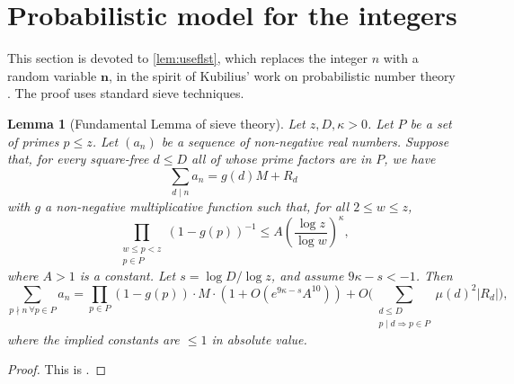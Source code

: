 \documentclass[11pt]{amsart}
\newtheorem{lemma}[theorem]{Lemma}
\theoremstyle{definition}
\renewcommand{\leq}{\leqslant}
\newcommand{\n}{\mathbf{n}}
\begin{document}
\section{Probabilistic model for the integers}
\label{sec:probmodel}

This section is devoted to \cref{lem:useflst}, which replaces the integer $n$ with a random variable $\n$, in the spirit of Kubilius' work on probabilistic number theory \cite{kub}. The proof uses standard sieve techniques.

\begin{lemma}[Fundamental Lemma of sieve theory] 
\label{lem:flst}
Let $z, D, \kappa > 0$. Let $P$ be a set of primes $p\leq z$. Let $(a_n)$ be a sequence of non-negative real numbers. Suppose that, for every square-free $d\leq D$ all of whose prime factors are in $P$, we have
\begin{equation*}
	\sum_{d\mid n} a_n = g(d)M + R_d
\end{equation*} 
with $g$ a non-negative multiplicative function such that, for all $2\leq w\leq z$, 
\begin{equation*}
	\prod_{\substack{w\leq p < z \\ p\in P}} (1-g(p))^{-1} \leq A \left(\frac{\log z}{\log w}\right)^{\kappa},
\end{equation*}
where $A > 1$ is a constant. Let $s = {\log D}/\log z$, and assume $9\kappa - s < -1$. Then 
\begin{equation*}
\sum_{p\nmid n \, \forall p\in P} a_n = \prod_{p\in P}\left(1-g(p)\right) \cdot M \cdot \left(1+O(e^{9\kappa - s}A^{10})\right) + O \Bigg(\sum_{\substack{d\leq D\\p\mid d \Rightarrow p\in P}} \mu(d)^2|R_d|\Bigg),
\end{equation*}
where the implied constants are $\leq 1$ in absolute value.
\end{lemma}

\begin{proof}
This is \cite[Theorem~6.9]{opera}.
\end{proof}
\end{document}
